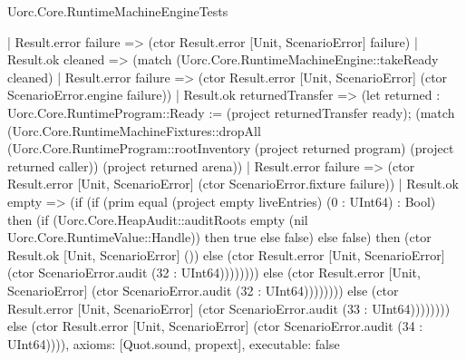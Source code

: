 \begin{lexlean}{Uorc.Core.RuntimeMachineEngineTests}
\begin{semanticmodule}
{                    | Result.error failure => (ctor Result.error [Unit, ScenarioError] failure)
                    | Result.ok cleaned => (match (Uorc.Core.RuntimeMachineEngine::takeReady cleaned)
                      | Result.error failure => (ctor Result.error [Unit, ScenarioError] (ctor ScenarioError.engine failure))
                      | Result.ok returnedTransfer => (let returned : Uorc.Core.RuntimeProgram::Ready := (project returnedTransfer ready); (match (Uorc.Core.RuntimeMachineFixtures::dropAll (Uorc.Core.RuntimeProgram::rootInventory (project returned program) (project returned caller)) (project returned arena))
                        | Result.error failure => (ctor Result.error [Unit, ScenarioError] (ctor ScenarioError.fixture failure))
                        | Result.ok empty => (if (if (prim equal (project empty liveEntries) (0 : UInt64) : Bool) then (if (Uorc.Core.HeapAudit::auditRoots empty (nil Uorc.Core.RuntimeValue::Handle)) then true else false) else false) then (ctor Result.ok [Unit, ScenarioError] ()) else (ctor Result.error [Unit, ScenarioError] (ctor ScenarioError.audit (32 : UInt64)))))))) else (ctor Result.error [Unit, ScenarioError] (ctor ScenarioError.audit (32 : UInt64)))))))) else (ctor Result.error [Unit, ScenarioError] (ctor ScenarioError.audit (33 : UInt64)))))))) else (ctor Result.error [Unit, ScenarioError] (ctor ScenarioError.audit (34 : UInt64)))),
  axioms: [Quot.sound, propext],
  executable: false
}


\end{semanticmodule}
\end{lexlean}
